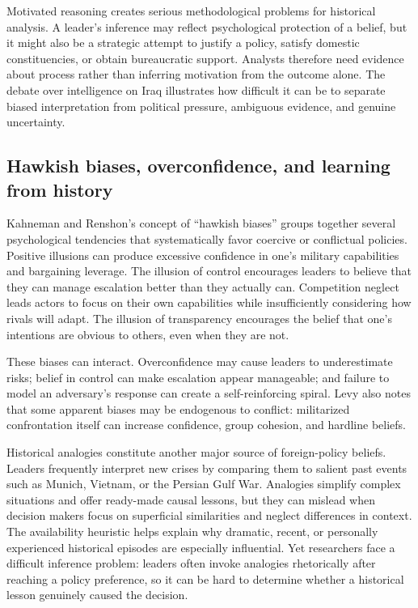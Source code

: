 Motivated reasoning creates serious methodological problems for historical analysis. A leader's inference may reflect psychological protection of a belief, but it might also be a strategic attempt to justify a policy, satisfy domestic constituencies, or obtain bureaucratic support. Analysts therefore need evidence about process rather than inferring motivation from the outcome alone. The debate over intelligence on Iraq illustrates how difficult it can be to separate biased interpretation from political pressure, ambiguous evidence, and genuine uncertainty.

\subsection{Hawkish biases, overconfidence, and learning from history}

Kahneman and Renshon's concept of ``hawkish biases'' groups together several psychological tendencies that systematically favor coercive or conflictual policies. Positive illusions can produce excessive confidence in one's military capabilities and bargaining leverage. The illusion of control encourages leaders to believe that they can manage escalation better than they actually can. Competition neglect leads actors to focus on their own capabilities while insufficiently considering how rivals will adapt. The illusion of transparency encourages the belief that one's intentions are obvious to others, even when they are not.

These biases can interact. Overconfidence may cause leaders to underestimate risks; belief in control can make escalation appear manageable; and failure to model an adversary's response can create a self-reinforcing spiral. Levy also notes that some apparent biases may be endogenous to conflict: militarized confrontation itself can increase confidence, group cohesion, and hardline beliefs.

Historical analogies constitute another major source of foreign-policy beliefs. Leaders frequently interpret new crises by comparing them to salient past events such as Munich, Vietnam, or the Persian Gulf War. Analogies simplify complex situations and offer ready-made causal lessons, but they can mislead when decision makers focus on superficial similarities and neglect differences in context. The availability heuristic helps explain why dramatic, recent, or personally experienced historical episodes are especially influential. Yet researchers face a difficult inference problem: leaders often invoke analogies rhetorically after reaching a policy preference, so it can be hard to determine whether a historical lesson genuinely caused the decision.

